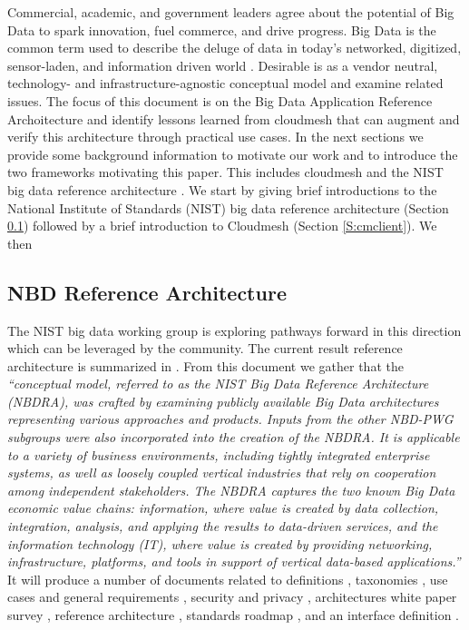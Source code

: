 Commercial, academic, and government leaders agree about the potential
of {\em} Big Data to spark innovation, fuel commerce, and drive
progress. Big Data is the common term used to describe the deluge of
data in today’s networked, digitized, sensor-laden, and information
driven world \cite{nist-bd}. Desirable is as a vendor neutral,
technology- and infrastructure-agnostic conceptual model and examine
related issues.  The focus of this document is on the Big Data
Application Reference Archoitecture and identify lessons learned from
cloudmesh that can augment and verify this architecture through
practical use cases. In the next sections we provide some background
information to motivate our work and to introduce the two frameworks
motivating this paper. This includes cloudmesh \cite{las12-cloud}
\cite{github-cloudmesh-client} and the NIST big data reference
architecture \cite{nist-bd}.  We start by giving brief introductions
to the National Institute of Standards (NIST) big data reference
architecture (Section \ref{S:NBDarch}) followed by a brief
introduction to Cloudmesh (Section \ref{S:cmclient}).  We then

\subsection{NBD Reference Architecture}
\label{S:NBDarch}

The NIST big data working group is exploring pathways
forward in this direction which can be leveraged by the community. The
current result reference architecture is summarized in
\cite{nist-bd}. From this document we gather that the {\it
  ``conceptual model, referred to as the NIST Big Data Reference
  Architecture (NBDRA), was crafted by examining publicly available
  Big Data architectures representing various approaches and
  products. Inputs from the other NBD-PWG subgroups were also
  incorporated into the creation of the NBDRA. It is applicable to a
  variety of business environments, including tightly integrated
  enterprise systems, as well as loosely coupled vertical industries
  that rely on cooperation among independent stakeholders. The NBDRA
  captures the two known Big Data economic value chains: information,
  where value is created by data collection, integration, analysis,
  and applying the results to data-driven services, and the
  information technology (IT), where value is created by providing
  networking, infrastructure, platforms, and tools in support of
  vertical data-based applications.''}  It will produce a number of
documents related to definitions \cite{??}, taxonomies \cite{??}, use
cases and general requirements \cite{??}, security and privacy
\cite{??}, architectures white paper survey \cite{??}, reference
architecture \cite{??}, standards roadmap \cite{??}, and an interface
definition \cite{??}.

